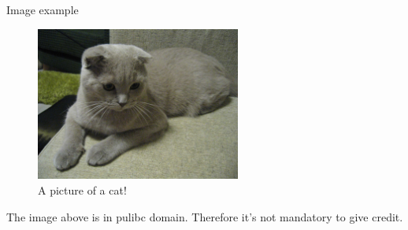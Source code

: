 \begin{frame}{Image example}

  \vspace{0.3cm}

  \begin{figure}
    \includegraphics[width=0.6\textwidth]{images/cat-1.jpg}
    \caption{A picture of a cat!}
  \end{figure}
  
  The image above is in pulibc domain. Therefore it's not mandatory to give credit. 

\end{frame}